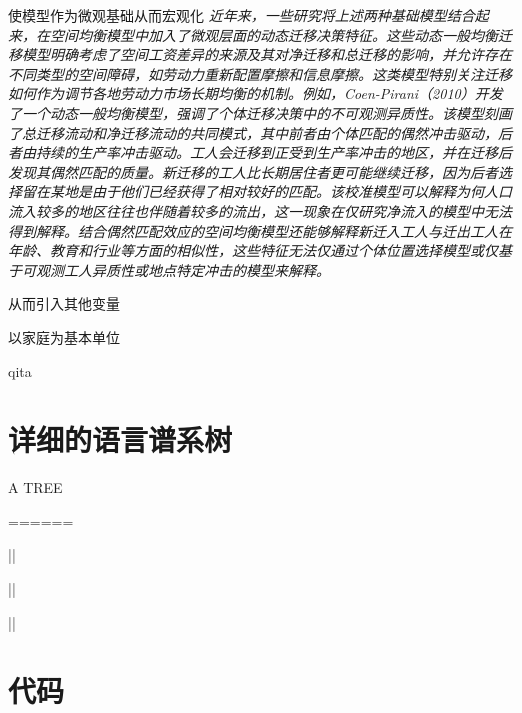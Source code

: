 \documentclass[master, final]{zufe-thesis}
\begin{document}
使模型作为微观基础从而宏观化
\textit{近年来，一些研究将上述两种基础模型结合起来，在空间均衡模型中加入了微观层面的动态迁移决策特征。这些动态一般均衡迁移模型明确考虑了空间工资差异的来源及其对净迁移和总迁移的影响，并允许存在不同类型的空间障碍，如劳动力重新配置摩擦和信息摩擦。这类模型特别关注迁移如何作为调节各地劳动力市场长期均衡的机制。例如，Coen-Pirani（2010）开发了一个动态一般均衡模型，强调了个体迁移决策中的不可观测异质性。该模型刻画了总迁移流动和净迁移流动的共同模式，其中前者由个体匹配的偶然冲击驱动，后者由持续的生产率冲击驱动。工人会迁移到正受到生产率冲击的地区，并在迁移后发现其偶然匹配的质量。新迁移的工人比长期居住者更可能继续迁移，因为后者选择留在某地是由于他们已经获得了相对较好的匹配。该校准模型可以解释为何人口流入较多的地区往往也伴随着较多的流出，这一现象在仅研究净流入的模型中无法得到解释。结合偶然匹配效应的空间均衡模型还能够解释新迁入工人与迁出工人在年龄、教育和行业等方面的相似性，这些特征无法仅通过个体位置选择模型或仅基于可观测工人异质性或地点特定冲击的模型来解释。}

从而引入其他变量

以家庭为基本单位


qita


\backmatter

\appendix

\newpage
\chapter{详细的语言谱系树}

A TREE

======

      ||
      
      ||
      
      ||

\newpage
\chapter{代码}


\newpage
%
%
%
\printbibliography[heading=bibliography,title=参考文献]
\end{document}
